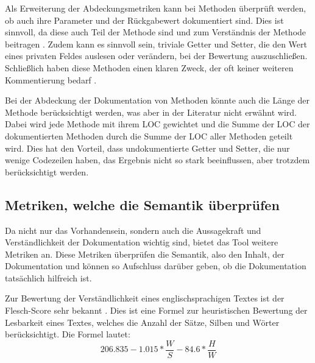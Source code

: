 Als Erweiterung der Abdeckungsmetriken kann bei Methoden überprüft werden, ob auch ihre Parameter und der Rückgabewert dokumentiert sind. Dies ist sinnvoll, da diese auch Teil der Methode sind und zum Verständnis der Methode beitragen \cite[S. 5]{HowDocumentationEvolvesoverTime}. Zudem kann es sinnvoll sein, triviale Getter und Setter, die den Wert eines privaten Feldes auslesen oder verändern, bei der Bewertung auszuschließen. Schließlich haben diese Methoden einen klaren Zweck, der oft keiner weiteren Kommentierung bedarf \cite[S. 254]{JavadocViolationsandTheirEvolutioninOpen-SourceSoftware}.

Bei der Abdeckung der Dokumentation von Methoden könnte auch die Länge der Methode berücksichtigt werden, was aber in der Literatur nicht erwähnt wird. Dabei wird jede Methode mit ihrem \ac{LOC} gewichtet und die Summe der \ac{LOC} der dokumentierten Methoden durch die Summe der \ac{LOC} aller Methoden geteilt wird. Dies hat den Vorteil, dass undokumentierte Getter und Setter, die nur wenige Codezeilen haben, das Ergebnis nicht so stark beeinflussen, aber trotzdem berücksichtigt werden. 


\subsection{Metriken, welche die Semantik überprüfen}\label{chapter:metrics_semantic}

Da nicht nur das Vorhandensein, sondern auch die Aussagekraft und Verständlichkeit der Dokumentation wichtig sind, bietet das Tool weitere Metriken an. Diese Metriken überprüfen die Semantik, also den Inhalt, der Dokumentation und können so Aufschluss darüber geben, ob die Dokumentation tatsächlich hilfreich ist. 

Zur Bewertung der Verständlichkeit eines englischsprachigen Textes ist der Flesch-Score sehr bekannt \cite[S. 21]{ThePrinciplesofReadability}. Dies ist eine Formel zur heuristischen Bewertung der Lesbarkeit eines Textes, welches die Anzahl der Sätze, Silben und Wörter berücksichtigt. Die Formel lautet:
\begin{equation}
   206.835-1.015*\frac{W}{S}-84.6*\frac{H}{W}
\end{equation}

